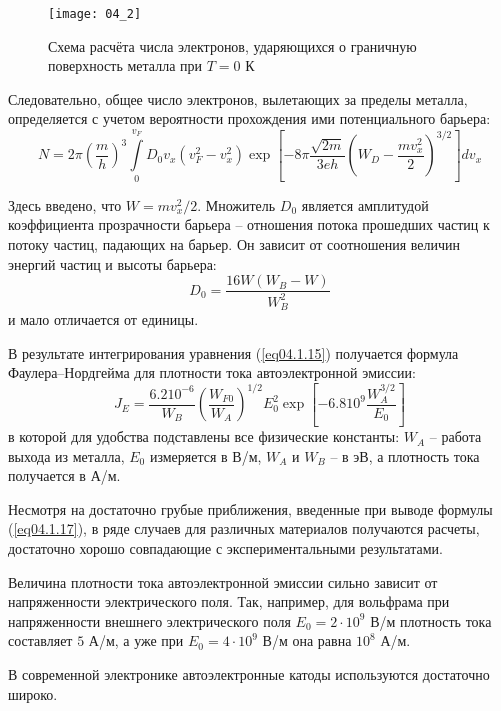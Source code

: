 \begin{figure}[h]
    \center
    \texttt{[image: 04\_2]}
    \caption{Схема расчёта числа электронов, ударяющихся о граничную 
    	поверхность металла при \( T = 0 \) К}
    \label{img04.2}
\end{figure}
Следовательно, общее число электронов, вылетающих за пределы металла, 
определяется с учетом вероятности прохождения ими потенциального барьера:
\begin{equation}
	N = 2\pi\left( \frac{m}{h} \right)^3 \int\limits_{0}^{v_F} 
		D_0 v_x \left( v^2_F - v^2_x \right) 
		\exp\left[ -8\pi\frac{\sqrt{2m}}{3eh} 
		\left( W_D - \frac{mv^2_x}{2} \right)^{3/2} \right] dv_x
	\label{eq04.1.15}
\end{equation}

Здесь введено, что \( W = mv^2_x / 2 \). Множитель \( D_0 \) является 
амплитудой коэффициента прозрачности барьера -- отношения потока прошедших 
частиц к потоку частиц, падающих на барьер. Он зависит от соотношения величин 
энергий частиц и высоты барьера:
\begin{equation}
	D_0 = \frac{16W(W_B-W)}{W^2_B}
	\label{eq04.1.16}
\end{equation}
и мало отличается от единицы.

В результате интегрирования уравнения (\ref{eq04.1.15}) получается формула 
Фаулера–Нордгейма для плотности тока автоэлектронной эмиссии:
\begin{equation}
	J_E = \frac{6.210^{-6}}{W_B}\left( \frac{W_{F0}}{W_A} \right)^{1/2}
		E^2_0 \exp\left[ -6.810^9 \frac{W_A^{3/2}}{E_0} \right]
	\label{eq04.1.17}
\end{equation}
в которой для удобства подставлены все физические константы: \( W_A \) -- 
работа выхода из металла, \( E_0 \) измеряется в В/м, \( W_A \) и \( W_B \) -- 
в эВ, а плотность тока получается в А/м.

Несмотря на достаточно грубые приближения, введенные при выводе формулы 
(\ref{eq04.1.17}), в ряде случаев для различных материалов получаются расчеты, 
достаточно хорошо совпадающие с экспериментальными результатами.

Величина плотности тока автоэлектронной эмиссии сильно зависит от 
напряженности электрического поля. Так, например, для вольфрама при 
напряженности внешнего электрического поля \( E_0 = 2\cdot10^9 \) В/м 
плотность тока составляет \( 5 \) А/м, а уже при \( E_0 = 4\cdot10^9 \) В/м 
она равна \( 10^8 \) А/м.

В современной электронике автоэлектронные катоды используются достаточно 
широко.
